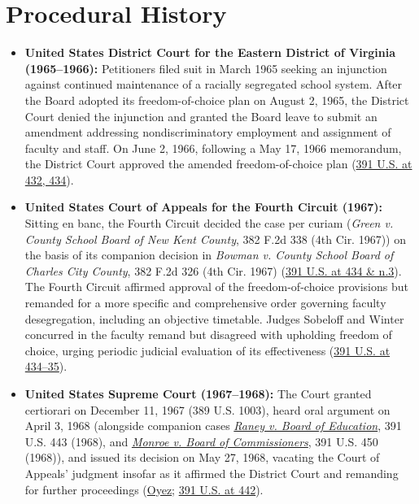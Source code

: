 \documentclass[12pt]{article}
\begin{document}
\section{Procedural History}

\begin{itemize}
\item \textbf{United States District Court for the Eastern District of Virginia (1965--1966):} Petitioners filed suit in March 1965 seeking an injunction against continued maintenance of a racially segregated school system. After the Board adopted its freedom-of-choice plan on August 2, 1965, the District Court denied the injunction and granted the Board leave to submit an amendment addressing nondiscriminatory employment and assignment of faculty and staff. On June 2, 1966, following a May 17, 1966 memorandum, the District Court approved the amended freedom-of-choice plan (\href{https://supreme.justia.com/cases/federal/us/391/430/}{391 U.S. at 432, 434}).
\item \textbf{United States Court of Appeals for the Fourth Circuit (1967):} Sitting en banc, the Fourth Circuit decided the case per curiam (\textit{Green v. County School Board of New Kent County}, 382 F.2d 338 (4th Cir. 1967)) on the basis of its companion decision in \textit{Bowman v. County School Board of Charles City County}, 382 F.2d 326 (4th Cir. 1967) (\href{https://supreme.justia.com/cases/federal/us/391/430/}{391 U.S. at 434 \& n.3}). The Fourth Circuit affirmed approval of the freedom-of-choice provisions but remanded for a more specific and comprehensive order governing faculty desegregation, including an objective timetable. Judges Sobeloff and Winter concurred in the faculty remand but disagreed with upholding freedom of choice, urging periodic judicial evaluation of its effectiveness (\href{https://supreme.justia.com/cases/federal/us/391/430/}{391 U.S. at 434--35}).
\item \textbf{United States Supreme Court (1967--1968):} The Court granted certiorari on December 11, 1967 (389 U.S. 1003), heard oral argument on April 3, 1968 (alongside companion cases \href{https://supreme.justia.com/cases/federal/us/391/443/}{\textit{Raney v. Board of Education}}, 391 U.S. 443 (1968), and \href{https://caselaw.findlaw.com/court/us-supreme-court/391/450.html}{\textit{Monroe v. Board of Commissioners}}, 391 U.S. 450 (1968)), and issued its decision on May 27, 1968, vacating the Court of Appeals' judgment insofar as it affirmed the District Court and remanding for further proceedings (\href{https://www.oyez.org/cases/1967/695}{Oyez}; \href{https://supreme.justia.com/cases/federal/us/391/430/}{391 U.S. at 442}).
\end{itemize}
\end{document}
